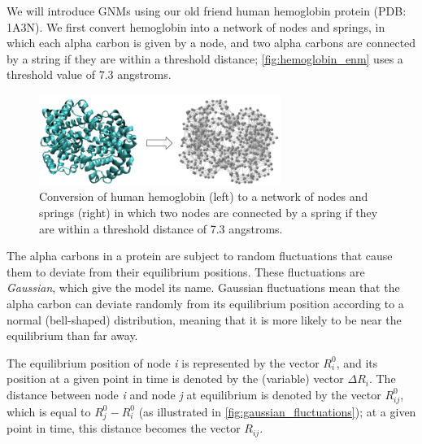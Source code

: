 We will introduce GNMs using our old friend human hemoglobin protein (PDB: 1A3N). We first convert hemoglobin into a network of nodes and springs, in which each alpha carbon is given by a node, and two alpha carbons are connected by a string if they are within a threshold distance; \autoref{fig:hemoglobin_enm} uses a threshold value of 7.3 angstroms.

\begin{figure}[h]
	\centering
	\mySfFamily
	\includegraphics[width = 0.7\textwidth]{../images/hemoglobin_enm.png}
	\caption{Conversion of human hemoglobin (left) to a network of nodes and springs (right) in which two nodes are connected by a spring if they are within a threshold distance of 7.3 angstroms.}
	\label{fig:hemoglobin_enm}
\end{figure}

The alpha carbons in a protein are subject to random fluctuations that cause them to deviate from their equilibrium positions. These fluctuations are \textit{Gaussian}, which give the model its name. Gaussian fluctuations mean that the alpha carbon can deviate randomly from its equilibrium position according to a normal (bell-shaped) distribution, meaning that it is more likely to be near the equilibrium than far away.

The equilibrium position of node \textit{i} is represented by the vector $ R_i^0 $, and its position at a given point in time is denoted by the (variable) vector $ \Delta R_i $. The distance between node \textit{i} and node \textit{j} at equilibrium is denoted by the vector $ R_{ij}^0 $, which is equal to $ R_j^0 - R_i^0 $ (as illustrated in \autoref{fig:gaussian_fluctuations}); at a given point in time, this distance becomes the vector $ R_{ij} $.

